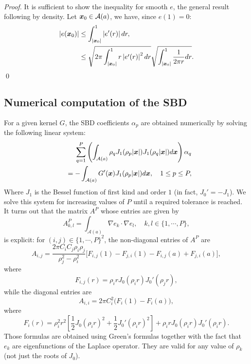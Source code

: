 \documentclass[smallextended]{svjour3}
\begin{document}
\begin{proof}
	It is sufficient to show the inequality for smooth $e$, the general result following by density. Let $\boldsymbol{x}_0 \in \mathcal{A}(a)$, we have, since $e(1)=0$:
	\begin{align}
		\left\lvert e(\boldsymbol{x}_0) \right\rvert & \leq \int_{\left\lvert \boldsymbol{x}_0 \right\rvert}^1 \left\lvert e'(r) \right\rvert dr,                                                                     \\
		                  & \leq \sqrt{2\pi \int_{\left\lvert \boldsymbol{x}_0 \right\rvert}^1 r \left\lvert e'(r) \right\rvert^2 dr} \sqrt{\int_{\left\lvert \boldsymbol{x}_0 \right\rvert}^1 \frac{1}{2\pi r} dr}.
	\end{align}	
	\qed				
\end{proof}

																		
\subsection{Numerical computation of the SBD}
\label{sub:Chol}
																		
For a given kernel $G$, the SBD coefficients $\alpha_p$ are obtained numerically by solving the following linear system: 
\begin{equation}
\begin{split}
\sum_{q = 1}^P \left(\int_{\mathcal{A}(a)} \rho_ q J_1(\rho_p|\boldsymbol{x}|) J_1(\rho_q|\boldsymbol{x}|) d\boldsymbol{x}\right) \alpha_q \\
\quad = -\int_{\mathcal{A}(a)} G'(\boldsymbol{x}) J_1(\rho_p|\boldsymbol{x}|)d\boldsymbol{x}, \quad 1\leq p \leq P,
\end{split}	
\label{LinearSystem}
\end{equation}
Where $J_1$ is the Bessel function of first kind and order $1$ (in fact, $J_0' = - J_1$). We solve this system for increasing values of $P$ until a required tolerance is reached. It turns out that the matrix $A^P$ whose entries are given by
\[ A^P_{k,l} = \int_{\mathcal{A}(a)} \!\!\!\!\!\!\!\! \nabla e_k \cdot \nabla e_l,\quad k,l \in \{1,\cdots,P\},\]
is explicit: for $(i,j) \in \{1,\cdots,P\}^2$, the non-diagonal entries of $A^P$ are
\begin{equation*}
	A_{i,j} = \frac{2\pi C_i C_j \rho_i \rho_j}{\rho_j^2 - \rho_i^2}\bigg[F_{i,j}(1) - F_{j,i}(1) - F_{i,j}(a) + F_{j,i}(a)\bigg],
\end{equation*}
where 
\[	 F_{i,j}(r) =  \rho_i r J_0(\rho_i r)J_0'(\rho_j r),\]
while the diagonal entries are
\begin{equation*}
	A_{i,i} = 2\pi C_i^2 \big(F_i(1) - F_i(a)\big),
\end{equation*}
where 
\[F_i(r) = \rho_i^2r^2\left[\dfrac{1}{2}J_0(\rho_ir)^2 + \frac{1}{2}J_0'(\rho_ir)^2\right] + \rho_irJ_0(\rho_i r)J_0'(\rho_ir).\]
Those formulas are obtained using Green's formulas together with the fact that $e_k$ are eigenfunctions of the Laplace operator. They are valid for any value of $\rho_k$ (not just the roots of $J_0$).
																		
\end{document}
